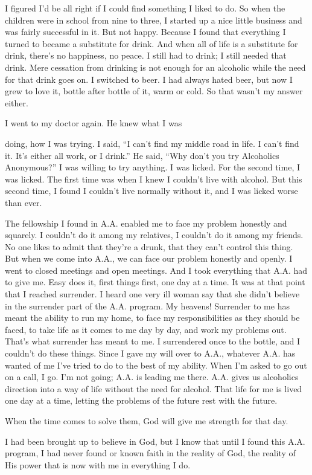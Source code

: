 \begin{biblechapter}
I figured I’d be all right if I could find something I liked to do. So when the children were in school from nine to three, I started up a nice little business and was fairly successful in it. But not happy. Because I found that everything I turned to became a substitute for drink. And when all of life is a substitute for drink, there’s no happiness, no peace. I still had to drink; I still needed that drink. Mere cessation from drinking is not enough for an alcoholic while the need for that drink goes on. I switched to beer. I had always hated beer, but now I grew to love it, bottle after bottle of it, warm or cold. So that wasn’t my answer either.

I went to my doctor again. He knew what I was

doing, how I was trying. I said, “I can’t find my middle road in life. I can’t find it. It’s either all work, or I drink.” He said, “Why don’t you try Alcoholics Anonymous?” I was willing to try anything. I was licked. For the second time, I was licked. The first time was when I knew I couldn’t live with alcohol. But this second time, I found I couldn’t live normally without it, and I was licked worse than ever.

The fellowship I found in A.A. enabled me to face my problem honestly and squarely. I couldn’t do it among my relatives, I couldn’t do it among my friends. No one likes to admit that they’re a drunk, that they can’t control this thing. But when we come into A.A., we can face our problem honestly and openly. I went to closed meetings and open meetings. And I took everything that A.A. had to give me. Easy does it, first things first, one day at a time. It was at that point that I reached surrender. I heard one very ill woman say that she didn’t believe in the surrender part of the A.A. program. My heavens! Surrender to me has meant the ability to run my home, to face my responsibilities as they should be faced, to take life as it comes to me day by day, and work my problems out. That’s what surrender has meant to me. I surrendered once to the bottle, and I couldn’t do these things. Since I gave my will over to A.A., whatever A.A. has wanted of me I’ve tried to do to the best of my ability. When I’m asked to go out on a call, I go. I’m not going; A.A. is leading me there. A.A. gives us alcoholics direction into a way of life without the need for alcohol. That life for me is lived one day at a time, letting the problems of the future rest with the future.

When the time comes to solve them, God will give me strength for that day.

I had been brought up to believe in God, but I know that until I found this A.A. program, I had never found or known faith in the reality of God, the reality of His power that is now with me in everything I do.
\end{biblechapter}
